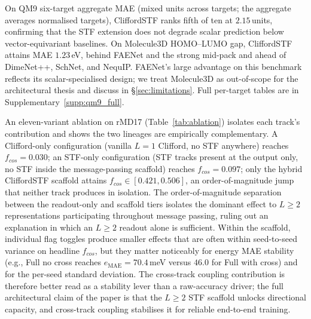 On QM9 six-target aggregate MAE (mixed units across targets; the aggregate averages normalised targets), CliffordSTF ranks fifth of ten at $2.15$\,units, confirming that the STF extension does not degrade scalar prediction below vector-equivariant baselines. On Molecule3D HOMO--LUMO gap, CliffordSTF attains MAE $1.23$\,eV, behind FAENet and the strong mid-pack and ahead of DimeNet++, SchNet, and NequIP. FAENet's large advantage on this benchmark reflects its scalar-specialised design; we treat Molecule3D as out-of-scope for the architectural thesis and discuss in \S\ref{sec:limitations}. Full per-target tables are in Supplementary~\ref{supp:qm9_full}.

An eleven-variant ablation on rMD17 (Table~\ref{tab:ablation}) isolates each track's contribution and shows the two lineages are empirically complementary. A Clifford-only configuration (vanilla $L{=}1$ Clifford, no STF anywhere) reaches $f_{cos}{=}0.030$; an STF-only configuration (STF tracks present at the output only, no STF inside the message-passing scaffold) reaches $f_{cos}{=}0.097$; only the hybrid CliffordSTF scaffold attains $f_{cos}{\in}[0.421, 0.506]$, an order-of-magnitude jump that neither track produces in isolation. The order-of-magnitude separation between the readout-only and scaffold tiers isolates the dominant effect to $L\!\geq\!2$ representations participating throughout message passing, ruling out an explanation in which an $L\!\geq\!2$ readout alone is sufficient. Within the scaffold, individual flag toggles produce smaller effects that are often within seed-to-seed variance on headline $f_{cos}$, but they matter noticeably for energy MAE stability (e.g., Full no cross reaches $e_{\text{MAE}}{=}70.4$\,meV versus $46.0$ for Full with cross) and for the per-seed standard deviation. The cross-track coupling contribution is therefore better read as a stability lever than a raw-accuracy driver; the full architectural claim of the paper is that the $L\!\geq\!2$ STF scaffold unlocks directional capacity, and cross-track coupling stabilises it for reliable end-to-end training.

